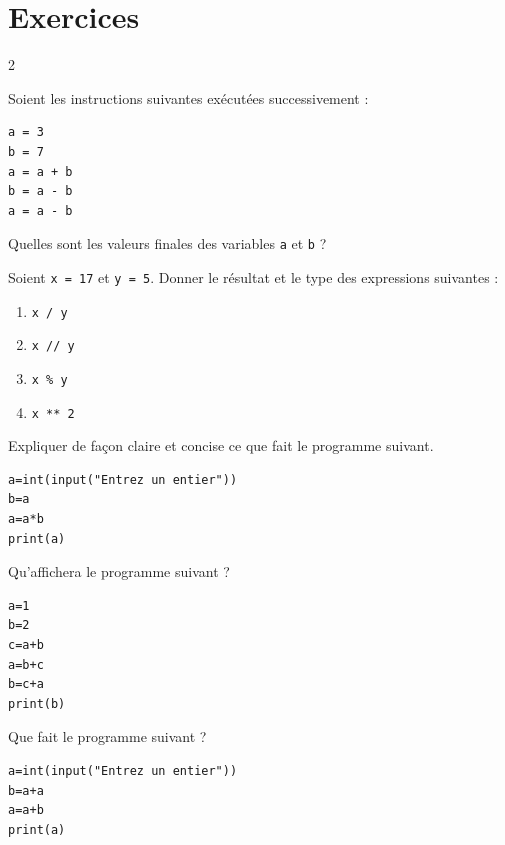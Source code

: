 \newpage

\section{Exercices}
 {
  \small
  \begin{multicols}{2}
	  \begin{exo}
		  Soient les instructions suivantes exécutées successivement :

		  \begin{lstlisting}
a = 3
b = 7
a = a + b
b = a - b
a = a - b
\end{lstlisting}

		  Quelles sont les valeurs finales des variables \lstinline|a| et \lstinline|b| ?
	  \end{exo}

	  \begin{exo}
		  Soient \lstinline|x = 17| et \lstinline|y = 5|. Donner le résultat et le type des expressions suivantes :
		  \begin{enumerate}[label=\alph*)]
			  \item \lstinline|x / y|
			  \item \lstinline|x // y|
			  \item \lstinline|x % y|
			  \item \lstinline|x ** 2|
		  \end{enumerate}
	  \end{exo}

	  \begin{exo}{}
		  Expliquer de façon claire et concise ce que fait le programme suivant.

		  \begin{lstlisting}
a=int(input("Entrez un entier"))
b=a
a=a*b
print(a)
\end{lstlisting}
	  \end{exo}

	  \begin{exo}{}
		  Qu'affichera le programme suivant ?

		  \begin{lstlisting}
a=1
b=2
c=a+b
a=b+c
b=c+a
print(b)
\end{lstlisting}
	  \end{exo}

	  \begin{exo}{}
		  Que fait le programme suivant ?

		  \begin{lstlisting}
a=int(input("Entrez un entier"))
b=a+a
a=a+b
print(a)
\end{lstlisting}
	  \end{exo}


\end{multicols}}
